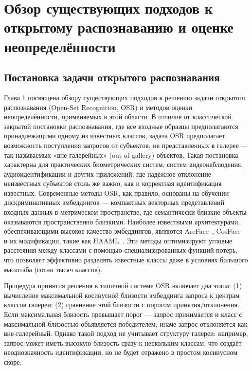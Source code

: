 \chapter{Обзор существующих подходов к открытому распознаванию и оценке неопределённости}\label{ch:related_work}

\section{Постановка задачи открытого распознавания}\label{sec:related_work/osr_formulation}
Глава 1 посвящена обзору существующих подходов к решению задачи открытого распознавания (Open-Set Recognition, OSR) и методов оценки неопределённости, применяемых в этой области.  
В отличие от классической закрытой постановки распознавания, где все входные образцы предполагаются принадлежащими одному из известных классов, задача OSR предполагает возможность поступления запросов от субъектов, не представленных в галерее — так называемых «вне-галерейных» (out-of-gallery) объектов.  
Такая постановка характерна для практических биометрических систем, систем видеонаблюдения, аудиоидентификации и других приложений, где надёжное отклонение неизвестных субъектов столь же важно, как и корректная идентификация известных.  
Современные методы OSR, как правило, основаны на обучении дискриминативных эмбеддингов — компактных векторных представлений входных данных в метрическом пространстве, где семантически близкие объекты оказываются пространственно близкими.  
Наиболее известными архитектурами, обеспечивающими высокое качество эмбеддингов, являются ArcFace~\cite{deng2019arcface}, CosFace~\cite{wang2018cosface} и их модификации, такие как HAAML~\cite{cao2025open}.  
Эти методы оптимизируют угловые расстояния между классами с помощью специализированных функций потерь, что позволяет эффективно разделять известные классы даже в условиях большого масштаба (сотни тысяч классов).  

Процедура принятия решения в типичной системе OSR включает два этапа: (1) вычисление максимальной косинусной близости эмбеддинга запроса к центрам классов галереи; (2) сравнение этой близости с порогом принятия/отклонения.  
Если максимальная близость превышает порог — запрос принимается и класс с максимальной близостью объявляется победителем; иначе запрос отклоняется как вне-галерейный.  
Однако такой подход не учитывает структуру галереи: например, запрос может иметь высокую близость сразу к нескольким классам, что создаёт неоднозначность идентификации, но не будет отражено в простом косинусном скоре.  
